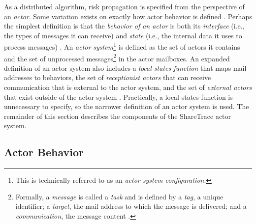 As a distributed algorithm, risk propagation is specified from the perspective of an \emph{actor}. Some variation exists on exactly how actor behavior is defined \cite{Agha1985, Koster2016}. Perhaps the simplest definition is that the \emph{behavior of an actor} is both its \emph{interface} (i.e., the types of messages it can receive) and \emph{state} (i.e., the internal data it uses to process messages) \cite{Koster2016}. An \emph{actor system}\footnote{This is technically referred to as an \emph{actor system configuration}.} is defined as the set of actors it contains and the set of unprocessed messages\footnote{Formally, a \emph{message} is called a \emph{task} and is defined by a \emph{tag}, a unique identifier; a \emph{target}, the mail address to which the message is delivered; and a \emph{communication}, the message content \cite{Agha1985}.} in the actor mailboxes. An expanded definition of an actor system also includes a \emph{local states function} that maps mail addresses to behaviors, the set of \emph{receptionist actors} that can receive communication that is external to the actor system, and the set of \emph{external actors} that exist outside of the actor system \cite{Agha1985}. Practically, a local states function is unnecessary to specify, so the narrower definition of an actor system is used. The remainder of this section describes the components of the ShareTrace actor system.

\subsection{Actor Behavior}\label{sec:actor-behavior}

